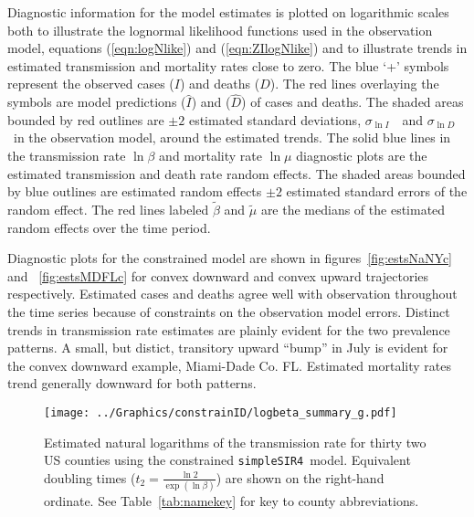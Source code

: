 \documentclass[12pt,letterpaper]{article}
\newcommand\SSm{{\tt simpleSIR4}}
\newcommand\slI{$\sigma_{\ln I}$\ }
\newcommand\slD{$\sigma_{\ln D}$}
\newcommand\slB{$\sigma_{\ln \beta}$}
\newcommand\slM{$\sigma_{\ln \mu}$}
\begin{document}
\label{pp:diagexpl} 
Diagnostic information for the model estimates is plotted
on logarithmic scales both to illustrate the
lognormal likelihood functions used in the observation model,
equations (\ref{eqn:logNlike}) and (\ref{eqn:ZIlogNlike}) and to
illustrate trends in estimated transmission and mortality rates close
to zero.
The blue `+' symbols represent the observed cases ($I$) and deaths ($D$).
The red lines overlaying the symbols are model predictions ($\widehat{I}$)
and ($\widehat{D}$) of cases and deaths. 
The shaded areas bounded by red outlines are 
$\pm 2$ estimated standard deviations, \slI\ and \slD\ in the
observation model, around the estimated trends.
The solid blue lines in the transmission rate $\ln \beta$ and
mortality rate $\ln \mu$ diagnostic plots are the estimated
transmission and death rate random effects.
The shaded areas bounded by blue outlines are
estimated random effects $\pm 2$ estimated standard errors of the
random effect.
The red lines labeled $\tilde{\beta}$ and $\tilde{\mu}$ are the
medians of the estimated random effects over the time period.

Diagnostic plots for the constrained model are shown in
figures~\ref{fig:estsNaNYc} and~ \ref{fig:estsMDFLc}
for convex downward and convex upward trajectories
respectively.
Estimated cases and deaths agree well with observation throughout the
time series because of constraints on the observation model errors.
Distinct trends in transmission rate estimates are plainly evident for
the two prevalence patterns. A small, but distict, 
transitory upward ``bump'' in July is
evident for the convex downward example, Miami-Dade Co. FL.
Estimated mortality rates trend generally downward  for both patterns.

\begin{figure}[h!]
\begin{center}
\texttt{[image: ../Graphics/constrainID/logbeta\_summary\_g.pdf]}\\
\end{center}
\caption{\label{fig:xrates}
Estimated natural logarithms of the transmission rate for thirty two US
counties using the constrained \SSm\ model.
Equivalent doubling times ($t_2 = \frac{\ln 2}{\exp(\ln \beta)}$)
are shown on the right-hand ordinate.
See Table~\ref{tab:namekey} for key to county abbreviations.
}
\end{figure}
\end{document}
